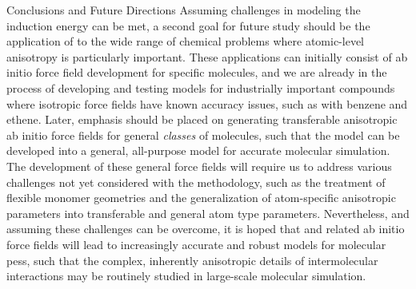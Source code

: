 \begin{chapter}{Conclusions and Future Directions}
Assuming challenges in modeling the induction energy can be met, a second goal
for future study should be the application of \mastiff to the wide range of
chemical problems where atomic-level anisotropy is particularly important.
These applications can initially consist of ab initio force field development
for specific molecules, and we are already in the process of developing and
testing models for industrially important compounds where
isotropic force fields have known accuracy issues, such as with benzene and
ethene.
Later, emphasis should be placed on generating transferable anisotropic ab initio force
fields for general \emph{classes} of molecules, such that the \mastiff model
can be developed into a general, all-purpose model for accurate molecular
simulation. The development of these general force fields will require us to address various
challenges not yet considered with the \mastiff methodology, such as the
treatment of flexible monomer geometries and the generalization of
atom-specific anisotropic parameters into transferable and general atom type parameters.
Nevertheless, and assuming these challenges can be overcome, it is hoped that
\mastiff and related ab initio force fields will lead to increasingly accurate
and robust models for molecular \glspl{pes},
such that the complex, inherently anisotropic details of
intermolecular interactions may be routinely studied in
large-scale molecular simulation.

\end{chapter}
